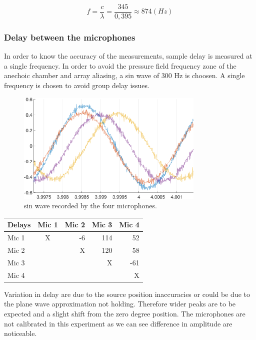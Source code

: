 \begin{equation}
    f=\frac{c}{\lambda}=\frac{345}{0,395} \approx 874 (Hz)
\end{equation}

 
\subsubsection{Delay between the microphones}
 
 In order to know the accuracy of the measurements, sample delay is measured at a single frequency. In order to avoid the pressure field frequency zone of the anechoic chamber and array aliasing,  a sin wave of 300 Hz is choosen. A single frequency is chosen to avoid group delay issues.  
 
 \begin{figure}[H]
    \centering
    \includegraphics[width=0.8\textwidth]{Figures/delaytetra300Hz.png}
    \caption{sin wave recorded by the four microphones.}
    \label{fig:pinknoise}
\end{figure}
 
 
\begin{center}
  \begin{tabular}{ | l | c | r | r | r |}
    \hline
    Delays & Mic 1 & Mic 2 & Mic 3 & Mic 4 \\ \hline
    Mic 1 & X & -6&114 & 52  \\ \hline
    Mic 2 &   & X &120 & 58  \\ \hline
    Mic 3 &   &   & X  &-61  \\ \hline
    Mic 4 &   &   &    & X   \\ \hline
  \end{tabular}
\end{center}

Variation in delay are due to the source position inaccuracies or could be due to the plane wave approximation not holding. Therefore wider peaks are to be expected and a slight shift from the zero degree position. The microphones are not calibrated in this experiment as we can see difference in amplitude are noticeable.
 
